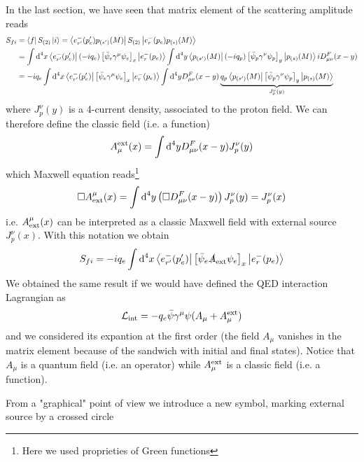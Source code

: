 \documentclass[TheoreticalPhy_ModB.tex]{subfiles}
\begin{document}
In the last section, we have seen that matrix element of the scattering amplitude reads
\begin{align*}
S_{fi}&=\bra f S_{(2)}\ket i=\bra{e_{r'}^-(p_e')p_{(s')}(M)}S_{(2)}\ket{e_{r}^-(p_e)p_{(s)}(M)}\\
&=\int\textup{d}^4x\bra{e_{r'}^-(p_e')}(-iq_e)\left[\bar\psi_e\gamma^\mu\psi_e\right]_x\ket{e_{r}^-(p_e)}
\int\textup{d}^4y\bra{p_{(s')}(M)}(-iq_p)\left[\bar\psi_p\gamma^\nu\psi_p\right]_y\ket{p_{(s)}(M)}
iD_{\mu\nu}^F(x-y)\\
&=-iq_e\int\textup{d}^4x\bra{e_{r'}^-(p_e')}\left[\bar\psi_e\gamma^\mu\psi_e\right]_x\ket{e_{r}^-(p_e)}
\int\textup{d}^4yD_{\mu\nu}^F(x-y)\underbrace{q_p\bra{p_{(s')}(M)}\left[\bar\psi_p\gamma^\nu\psi_p\right]_y\ket{p_{(s)}(M)}}_{J^\nu_p(y)}
\end{align*}
where $J^\nu_p(y)$ is a 4-current density, associated to the proton field. We can therefore define the classic field (i.e. a function)
\[A^{\textup{ext}}_\mu(x)=\int\textup{d}^4yD_{\mu\nu}^F(x-y)J^\nu_p(y)
\]
which Maxwell equation reads\footnote{Here we used proprieties of Green functions}
\[ \square A_{\textup{ext}}^\mu(x)=\int\textup{d}^4y\left(\square D_{\mu\nu}^F(x-y)\right)J^\nu_p(y)=J^\nu_p(x)\]
i.e. $A_{\textup{ext}}^\mu(x)$ can be interpreted as a classic Maxwell field with external source $J^\nu_p(x)$.
With this notation we obtain
\[S_{fi}=-iq_e\int\textup{d}^4x\bra{e_{r'}^-(p_e')}\left[\bar\psi_e\slashed A_{\textup{ext}}\psi_e\right]_x\ket{e_{r}^-(p_e)}\]
We obtained the same result if we would have defined the QED interaction Lagrangian as
\[\mathcal L_{\textup{int}}=-q_e\bar\psi\gamma^\mu\psi(A_\mu+A^{\textup{ext}}_\mu)\]
and we considered its expantion at the first order (the field $A_\mu$ vanishes in the matrix element because of the sandwich  with initial and final states). Notice that $A_\mu$ is a quantum field (i.e. an operator) while $A^{\textup{ext}}_\mu$ is a classic field (i.e. a function).

From a "graphical" point of view we introduce a new symbol, marking external source by a crossed circle

\begin{figure}[H]
\centering
{}
\end{figure}
\end{document}

